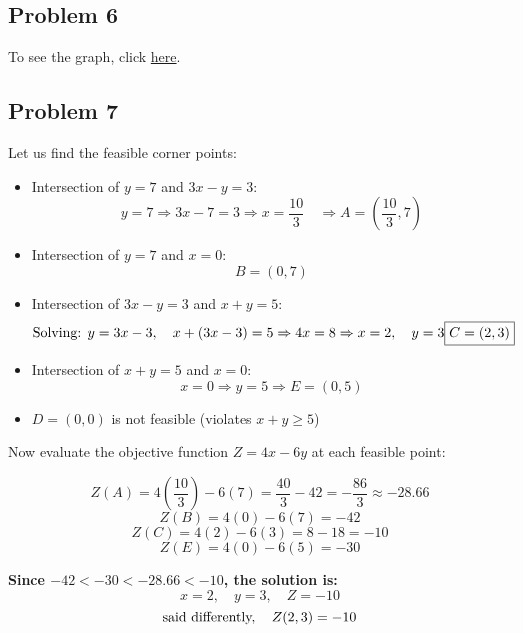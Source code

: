 \documentclass[12pt]{article}
\begin{document}
\subsection*{Problem 6}
To see the graph, click \href{https://www.desmos.com/calculator/g71beac03r}{here}.
\subsection*{Problem 7}
Let us find the feasible corner points:

\begin{itemize}
    \item Intersection of \( y = 7 \) and \( 3x - y = 3 \):  
    \[
    y = 7 \Rightarrow 3x - 7 = 3 \Rightarrow x = \dfrac{10}{3} \quad \Rightarrow \boxed{A = \left(\dfrac{10}{3}, 7\right)}
    \]

    \item Intersection of \( y = 7 \) and \( x = 0 \):  
    \[
    \boxed{B = (0, 7)}
    \]

    \item Intersection of \( 3x - y = 3 \) and \( x + y = 5 \):  
    \[
    \text{Solving: } y = 3x - 3, \quad x + (3x - 3) = 5 \Rightarrow 4x = 8 \Rightarrow x = 2, \quad y = 3 \\
    \boxed{C = (2, 3)}
    \]

    \item Intersection of \( x + y = 5 \) and \( x = 0 \):  
    \[
    x = 0 \Rightarrow y = 5 \Rightarrow \boxed{E = (0, 5)}
    \]

    \item \( D = (0, 0) \) is not feasible (violates \( x + y \geq 5 \))
\end{itemize}

Now evaluate the objective function \( Z = 4x - 6y \) at each feasible point:

\[
Z(A) = 4\left(\dfrac{10}{3}\right) - 6(7) = \dfrac{40}{3} - 42 = -\dfrac{86}{3} \approx -28.66
\]
\[
Z(B) = 4(0) - 6(7) = -42
\]
\[
Z(C) = 4(2) - 6(3) = 8 - 18 = \boxed{-10}
\]
\[
Z(E) = 4(0) - 6(5) = -30
\]

\textbf{Since \(-42<-30<-28.66<-10\), the solution is:}  
\[
x = 2, \quad y = 3, \quad Z = \boxed{-10}
\]
\[\text{said differently, } \hspace{0.3cm} Z(2,3)=-10\]
\end{document}
